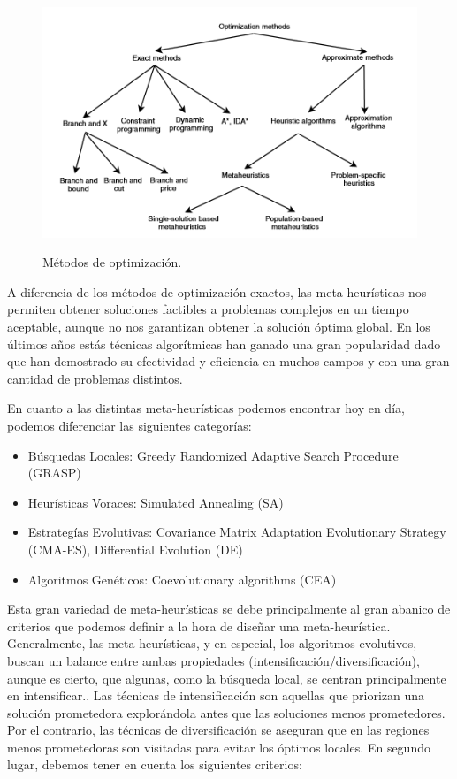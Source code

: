 \begin{figure}
  \caption{Métodos de optimización.}
  \centering
\includegraphics[scale=1.0]{images/meta}\\[10mm]
\end{figure}

A diferencia de los métodos de optimización exactos, las meta-heurísticas nos permiten obtener soluciones factibles a problemas complejos en un tiempo aceptable, aunque no nos garantizan obtener la solución óptima global.\cite{metaheuristics} En los últimos años estás técnicas algorítmicas han ganado una gran popularidad dado que han demostrado su efectividad y eficiencia en muchos campos y con una gran cantidad de problemas distintos.

En cuanto a las distintas meta-heurísticas podemos encontrar hoy en día, podemos diferenciar las siguientes categorías\cite{metaheuristics}:

\begin{itemize}
    \item Búsquedas Locales: Greedy Randomized Adaptive Search Procedure (GRASP) \cite{GRASP}
    \item Heurísticas Voraces: Simulated Annealing (SA) \cite{SA}
    \item Estrategías Evolutivas: Covariance Matrix Adaptation Evolutionary Strategy (CMA-ES)\cite{CMA}, Differential Evolution (DE) \cite{DE1, DE2, DE3}
    \item Algoritmos Genéticos: Coevolutionary algorithms (CEA) \cite{COE1, COE2, COE3}
\end{itemize}


Esta gran variedad de meta-heurísticas se debe principalmente al gran abanico de criterios que podemos definir a la hora de diseñar una meta-heurística. Generalmente, las meta-heurísticas, y en especial, los algoritmos evolutivos, buscan un balance entre ambas propiedades (intensificación/diversificación), aunque es cierto, que algunas, como la búsqueda local, se centran principalmente en intensificar.. Las técnicas de intensificación son aquellas que priorizan una solución prometedora explorándola antes que las soluciones menos prometedores. Por el contrario, las técnicas de diversificación se aseguran que en las regiones menos prometedoras son visitadas para evitar los óptimos locales.
En segundo lugar, debemos tener en cuenta los siguientes criterios:


